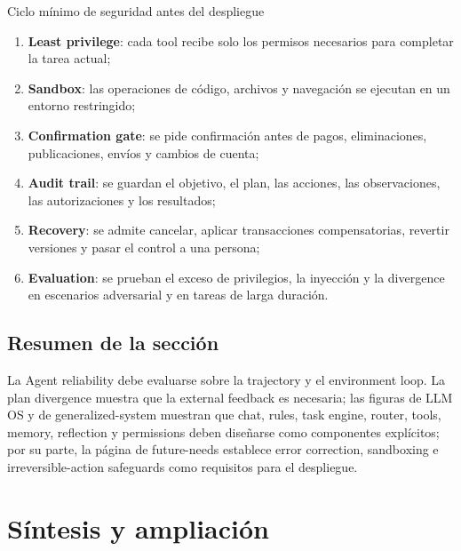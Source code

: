 \documentclass[a4paper]{article}
\begin{document}
\begin{importantbox}{Ciclo mínimo de seguridad antes del despliegue}
\begin{enumerate}
  \item \textbf{Least privilege}: cada tool recibe solo los permisos necesarios para completar la tarea actual;
  \item \textbf{Sandbox}: las operaciones de código, archivos y navegación se ejecutan en un entorno restringido;
  \item \textbf{Confirmation gate}: se pide confirmación antes de pagos, eliminaciones, publicaciones, envíos y cambios de cuenta;
  \item \textbf{Audit trail}: se guardan el objetivo, el plan, las acciones, las observaciones, las autorizaciones y los resultados;
  \item \textbf{Recovery}: se admite cancelar, aplicar transacciones compensatorias, revertir versiones y pasar el control a una persona;
  \item \textbf{Evaluation}: se prueban el exceso de privilegios, la inyección y la divergence en escenarios adversarial y en tareas de larga duración.
\end{enumerate}
\end{importantbox}


\subsection{Resumen de la sección}

La Agent reliability debe evaluarse sobre la trajectory y el environment loop. La plan divergence muestra que la external feedback es necesaria; las figuras de LLM OS y de generalized-system muestran que chat, rules, task engine, router, tools, memory, reflection y permissions deben diseñarse como componentes explícitos; por su parte, la página de future-needs establece error correction, sandboxing e irreversible-action safeguards como requisitos para el despliegue.
\section{Síntesis y ampliación}
\end{document}
